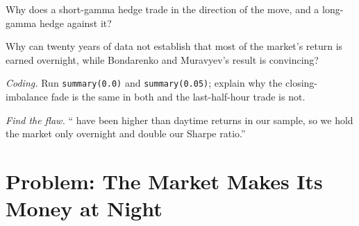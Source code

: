 \begin{exercise}[$\star\star$]\label{exo:s1:intraday-patterns:5}
Why does a short-gamma hedge trade in the direction of the move, and a long-gamma hedge against it?
\end{exercise}

\begin{exercise}[$\star\star$]\label{exo:s1:intraday-patterns:6}
Why can twenty years of data not establish that most of the market's return is earned overnight, while Bondarenko and Muravyev's result is convincing?
\end{exercise}

\begin{exercise}[$\star\star\star$]\label{exo:s1:intraday-patterns:7}
\emph{Coding.} Run \texttt{summary(0.0)} and \texttt{summary(0.05)}; explain why the closing-imbalance fade is the same in both and the last-half-hour trade
is not.
\end{exercise}

\begin{exercise}[$\star\star\star$]\label{exo:s1:intraday-patterns:8}
\emph{Find the flaw.} `` have been higher than daytime returns in our sample, so we hold the market only overnight and double our
Sharpe ratio.''
\end{exercise}

\section{Problem: The Market Makes Its Money at Night}

